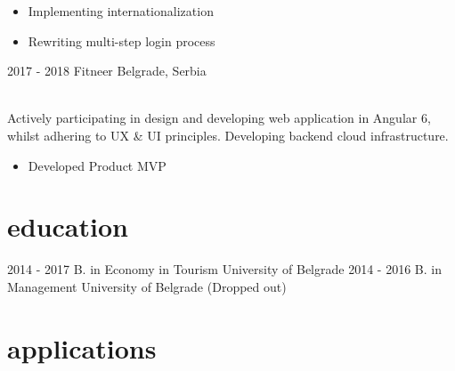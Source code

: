 \documentclass[]{cv-style}          %
\begin{document}
\begin{entrylist}
{    \begin{itemize}
      \item Implementing internationalization
      \item Rewriting multi-step login process
    \end{itemize}}
  \entry
  {2017 - 2018}
  {Fitneer}
  {Belgrade, Serbia}
  {\\
    Actively participating in design and developing web application in Angular 6, whilst adhering to UX \& UI principles. Developing backend cloud infrastructure.\\
    \subtitle{Detailed achievements:}
    \begin{itemize}
      \item Developed Product MVP
    \end{itemize}}

\end{entrylist}


\section{education}

\begin{entrylist}
  \entry
  {2014 - 2017}
  {B. {\normalfont in Economy in Tourism}}
  {University of Belgrade}
  {\vspace{-0.3cm}}
  \entry
  {2014 - 2016}
  {B. {\normalfont in Management}}
  {University of Belgrade}
  {(Dropped out)}
\end{entrylist}


\section{applications}
\end{document}
